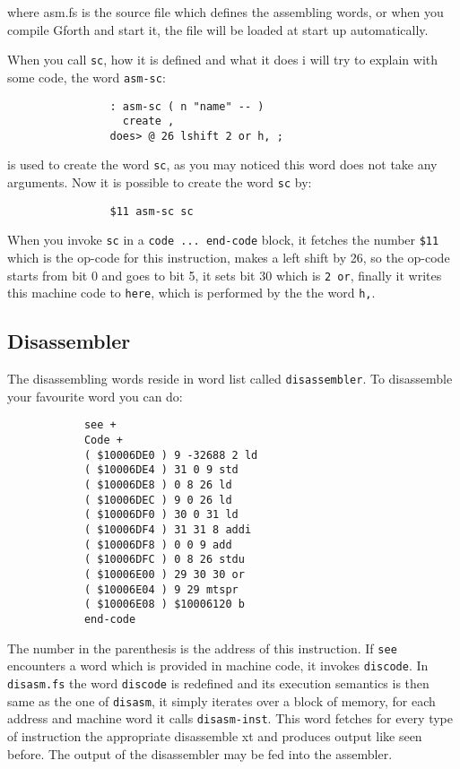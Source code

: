         where asm.fs is the source file which defines the assembling words, or
        when you compile Gforth and start it, the file will be loaded at 
        start up automatically.

        When you call \texttt{sc}, how it is defined and what it does i will try
        to explain with some code, the word \texttt{asm-sc}:

            \begin{verbatim}
                : asm-sc ( n "name" -- )
                  create ,
                does> @ 26 lshift 2 or h, ;
            \end{verbatim}

        is used to create the word \texttt{sc}, as you may noticed this word
        does not take any arguments. Now it is possible to create the word 
        \texttt{sc} by:

            \begin{verbatim}
                $11 asm-sc sc 
            \end{verbatim}

        When you invoke \texttt{sc} in a \texttt{code ... end-code} block, it
        fetches the number \texttt{\$11} which is the op-code for this
        instruction, makes a left shift by 26, so the op-code starts from bit 0
        and goes to bit 5, it sets bit 30 which is \texttt{2 or}, finally it 
        writes this machine code to \texttt{here}, which is performed by the 
        the word \texttt{h,}.
        
    \pagebreak
    \subsection{Disassembler}
        
        The disassembling words reside in word list called
        \texttt{disassembler}. To disassemble your favourite word you can do:
            \begin{verbatim}
            see +
            Code +  
            ( $10006DE0 ) 9 -32688 2 ld
            ( $10006DE4 ) 31 0 9 std
            ( $10006DE8 ) 0 8 26 ld
            ( $10006DEC ) 9 0 26 ld
            ( $10006DF0 ) 30 0 31 ld
            ( $10006DF4 ) 31 31 8 addi
            ( $10006DF8 ) 0 0 9 add
            ( $10006DFC ) 0 8 26 stdu
            ( $10006E00 ) 29 30 30 or
            ( $10006E04 ) 9 29 mtspr
            ( $10006E08 ) $10006120 b
            end-code
            \end{verbatim}
        The number in the parenthesis is the address of this instruction. If 
        \texttt{see} encounters a word which is provided in machine code, it 
        invokes \texttt{discode}. In \texttt{disasm.fs} the word 
        \texttt{discode} is redefined and its execution semantics is then same 
        as the one of \texttt{disasm}, it simply iterates over a block of
        memory, for each address and machine word it calls \texttt{disasm-inst}.
        This word fetches for every type of instruction the appropriate 
        disassemble xt and produces output like seen before.
        The output of the disassembler may be fed into the assembler.
